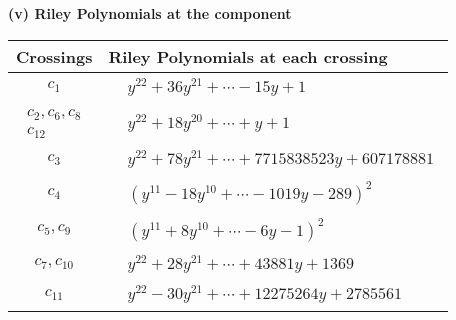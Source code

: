 \documentclass[1p]{elsarticle_modified}
\theoremstyle{definition}
\begin{document}
\newpage\renewcommand{\arraystretch}{1}
\flushleft \textbf{(v) Riley Polynomials at the component}\newline \\
\begin{tabular}{m{50pt}|m{274pt}}
Crossings & \hspace{64pt}Riley Polynomials at each crossing \\
\hline $$\begin{aligned}c_{1}\end{aligned}$$&$\begin{aligned}
&y^{22}+36 y^{21}+\cdots-15 y+1
\end{aligned}$\\
\hline $$\begin{aligned}c_{2},c_{6},c_{8}\\c_{12}\end{aligned}$$&$\begin{aligned}
&y^{22}+18 y^{20}+\cdots+y+1
\end{aligned}$\\
\hline $$\begin{aligned}c_{3}\end{aligned}$$&$\begin{aligned}
&y^{22}+78 y^{21}+\cdots+7715838523 y+607178881
\end{aligned}$\\
\hline $$\begin{aligned}c_{4}\end{aligned}$$&$\begin{aligned}
&(y^{11}-18 y^{10}+\cdots-1019 y-289)^{2}
\end{aligned}$\\
\hline $$\begin{aligned}c_{5},c_{9}\end{aligned}$$&$\begin{aligned}
&(y^{11}+8 y^{10}+\cdots-6 y-1)^{2}
\end{aligned}$\\
\hline $$\begin{aligned}c_{7},c_{10}\end{aligned}$$&$\begin{aligned}
&y^{22}+28 y^{21}+\cdots+43881 y+1369
\end{aligned}$\\
\hline $$\begin{aligned}c_{11}\end{aligned}$$&$\begin{aligned}
&y^{22}-30 y^{21}+\cdots+12275264 y+2785561
\end{aligned}$\\
\hline
\end{tabular}\\~\\
\end{document}
